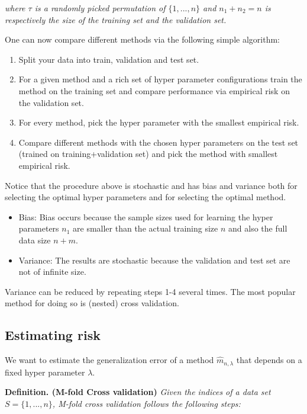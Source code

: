 \documentclass[
]{book}
\providecommand{\tightlist}{%
  \setlength{\itemsep}{0pt}\setlength{\parskip}{0pt}}
\begin{document}
\emph{where \(\tau\) is a randomly picked permutation of \(\{1,...,n\}\) and \(n_1+n_2=n\) is respectively the size of the training set and the validation set.}

One can now compare different methods via the following simple algorithm:

\begin{enumerate}
\def\labelenumi{\arabic{enumi}.}
\tightlist
\item
  Split your data into train, validation and test set.
\item
  For a given method and a rich set of hyper parameter configurations train the method on the training set and compare performance via empirical risk on the validation set.
\item
  For every method, pick the hyper parameter with the smallest empirical risk.
\item
  Compare different methods with the chosen hyper parameters on the test set (trained on training+validation set) and pick the method with smallest empirical risk.
\end{enumerate}

Notice that the procedure above is stochastic and has bias and variance both for selecting the optimal hyper parameters and for selecting the optimal method.

\begin{itemize}
\tightlist
\item
  Bias: Bias occurs because the sample sizes used for learning the hyper parameters \(n_1\) are smaller than the actual training size \(n\) and also the full data size \(n+m\).
\item
  Variance: The results are stochastic because the validation and test set are not of infinite size.
\end{itemize}

Variance can be reduced by repeating steps 1-4 several times. The most popular method for doing so is (nested) cross validation.

\hypertarget{estimating-risk}{%
\subsection{Estimating risk}\label{estimating-risk}}

We want to estimate the generalization error of a method \(\hat{m}_{n,\lambda}\) that depends on a fixed hyper parameter \(\lambda\).

\textbf{Definition. (M-fold Cross validation)} \emph{Given the indices of a data set \(S=\{1,...,n\}\), M-fold cross validation follows the following steps:}
\end{document}
